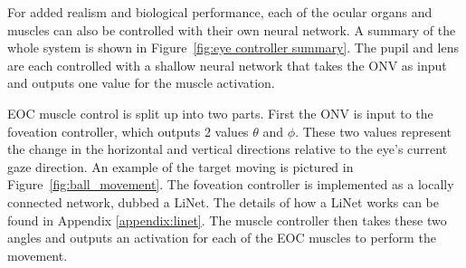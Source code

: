 \documentclass [MS] {UCLAthesis}
\begin{document}
For added realism and biological performance, each of the ocular organs and muscles can also be controlled with their own neural network. A summary of the whole system is shown in Figure~\ref{fig:eye controller summary}. The pupil and lens are each controlled with a shallow neural network that takes the ONV as input and outputs one value for the muscle activation.

EOC muscle control is split up into two parts. First the ONV is input to the foveation controller, which outputs 2 values $\theta$ and $\phi$. These two values represent the change in the horizontal and vertical directions relative to the eye's current gaze direction. An example of the target moving is pictured in Figure~\ref{fig:ball_movement}. The foveation controller is implemented as a locally connected network, dubbed a LiNet. The details of how a LiNet works can be found in Appendix \ref{appendix:linet}. The muscle controller then takes these two angles and outputs an activation for each of the EOC muscles to perform the movement.

\end{document}
